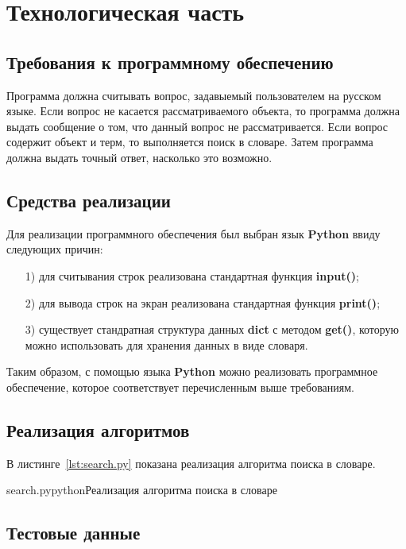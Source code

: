 \chapter{Технологическая часть}

\section{Требования к программному обеспечению}

Программа должна считывать вопрос, задавыемый пользователем на русском языке. 
Если вопрос не касается рассматриваемого объекта, то программа должна выдать сообщение о том, что данный вопрос не рассматривается. 
Если вопрос содержит объект и терм, то выполняется поиск в словаре. 
Затем программа должна выдать точный ответ, насколько это возможно.
 
\section{Средства реализации}

Для реализации программного обеспечения был выбран язык \textbf{Python} ввиду следующих причин:
\begin{enumerate}
\item[1)] для считывания строк реализована стандартная функция \textbf{input()};
\item[2)] для вывода строк на экран реализована стандартная функция \textbf{print()};
\item[3)] существует стандратная структура данных \textbf{dict} с методом \textbf{get()}, которую можно использовать для хранения данных в виде словаря.
\end{enumerate}

Таким образом, с помощью языка \textbf{Python} можно реализовать программное обеспечение, которое соответствует перечисленным выше требованиям.

\section{Реализация алгоритмов}

В листинге~\ref{lst:search.py} показана реализация алгоритма поиска в словаре.

{search.py}{python}{Реализация алгоритма поиска в словаре}

\section{Тестовые данные}

